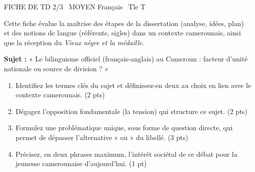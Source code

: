 \documentclass[11pt]{article}
\begin{document}
\pagestyle{empty}

\begin{tcolorbox}[
    enhanced,
    colback=popink,
    colframe=popink,
    arc=10pt,
    boxrule=0pt,
    left=12pt, right=12pt, top=9pt, bottom=9pt
]
{\color{white}\popxbold\small FICHE DE TD 2/3 \textbullet\ MOYEN \hfill Français \textbullet\ Tle T\par}
\end{tcolorbox}
\vspace{4pt}

\noindent Cette fiche évalue la maîtrise des étapes de la dissertation (analyse, idées, plan) et des notions de langue (référents, sigles) dans un contexte camerounais, ainsi que la réception du \textit{Vieux nègre et la médaille}.

\begin{exercice}
\textbf{Sujet :} « Le bilinguisme officiel (français-anglais) au Cameroun : facteur d'unité nationale ou source de division ? »

\begin{enumerate}
    \item Identifiez les termes clés du sujet et définissez-en deux au choix en lien avec le contexte camerounais. \hfill (2 pts)
    \item Dégagez l'opposition fondamentale (la tension) qui structure ce sujet. \hfill (2 pts)
    \item Formulez une problématique unique, sous forme de question directe, qui permet de dépasser l'alternative « ou » du libellé. \hfill (3 pts)
    \item Précisez, en deux phrases maximum, l'intérêt sociétal de ce débat pour la jeunesse camerounaise d'aujourd'hui. \hfill (1 pt)
\end{enumerate}
\end{exercice}
\end{document}
